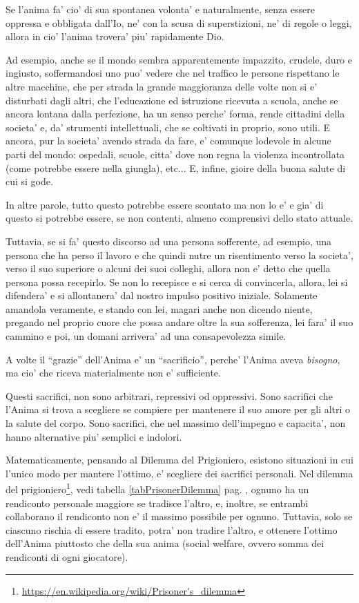 Se l'anima fa' cio' di sua spontanea volonta' e naturalmente, senza essere oppressa e obbligata dall'Io, ne' con la scusa di superstizioni, ne' di regole o leggi, allora in cio' l'anima trovera' piu' rapidamente Dio.

Ad esempio, anche se il mondo sembra apparentemente impazzito, crudele, duro e ingiusto, soffermandosi uno puo' vedere che nel traffico le persone rispettano le altre macchine, che per strada la grande maggioranza delle volte non si e' disturbati dagli altri, che l'educazione ed istruzione ricevuta a scuola, anche se ancora lontana dalla perfezione, ha un senso perche' forma, rende cittadini della societa' e, da' strumenti intellettuali, che se coltivati in proprio, sono utili. E ancora, pur la societa' avendo strada da fare, e' comunque lodevole in alcune parti del mondo: ospedali, scuole, citta' dove non regna la violenza incontrollata (come potrebbe essere nella giungla), etc... E, infine, gioire della buona salute di cui si gode.

In altre parole, tutto questo potrebbe essere scontato ma non lo e' e gia' di questo si potrebbe essere, se non contenti, almeno comprensivi dello stato attuale.

Tuttavia, se si fa' questo discorso ad una persona sofferente, ad esempio, una persona che ha perso il lavoro e che quindi nutre un risentimento verso la societa', verso il suo superiore o alcuni dei suoi colleghi, allora non e' detto che quella persona possa recepirlo. Se non lo recepisce e si cerca di convincerla, allora, lei si difendera' e si allontanera' dal nostro impulso positivo iniziale. Solamente amandola veramente, e stando con lei, magari anche non dicendo niente, pregando nel proprio cuore che possa andare oltre la sua sofferenza, lei fara' il suo cammino e poi, un domani arrivera' ad una consapevolezza simile.

A volte il ``grazie'' dell'Anima e' un ``sacrificio'', perche' l'Anima aveva \emph{bisogno}, ma cio' che riceva materialmente non e' sufficiente.

Questi sacrifici, non sono arbitrari, repressivi od oppressivi. Sono sacrifici che l'Anima si trova a scegliere se compiere per mantenere il suo amore per gli altri o la salute del corpo. Sono sacrifici, che nel massimo dell'impegno e capacita', non hanno alternative piu' semplici e indolori.

Matematicamente, pensando al Dilemma del Prigioniero, esistono situazioni in cui l'unico modo per mantere l'ottimo, e' scegliere dei sacrifici personali. Nel dilemma del prigioniero\footnote{\url{https://en.wikipedia.org/wiki/Prisoner's\_dilemma}}, vedi tabella \ref{tabPrisonerDilemma} pag. \pageref{tabPrisonerDilemma}, ognuno ha un rendiconto personale maggiore se tradisce l'altro, e, inoltre, se entrambi collaborano il rendiconto non e' il massimo possibile per ognuno. Tuttavia, solo se ciascuno rischia di essere tradito, potra' non tradire l'altro, e ottenere l'ottimo dell'Anima piuttosto che della sua anima (social welfare, ovvero somma dei rendiconti di ogni giocatore).

